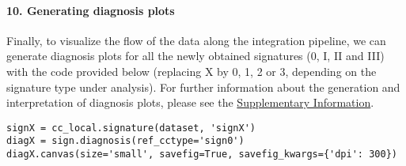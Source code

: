 \paragraph{10. Generating diagnosis plots} \leavevmode

Finally, to visualize the flow of the data along the integration pipeline, we can generate diagnosis plots for all the newly obtained signatures (0, I, II and III) with the code provided below (replacing X by 0, 1, 2 or 3, depending on the signature type under analysis). For further information about the generation and interpretation of diagnosis plots, please see the \hyperref[Protocols_SupplementaryInformation]{Supplementary Information}. \\

\begin{lstlisting}
signX = cc_local.signature(dataset, 'signX')
diagX = sign.diagnosis(ref_cctype='sign0')
diagX.canvas(size='small', savefig=True, savefig_kwargs={'dpi': 300})
\end{lstlisting}
